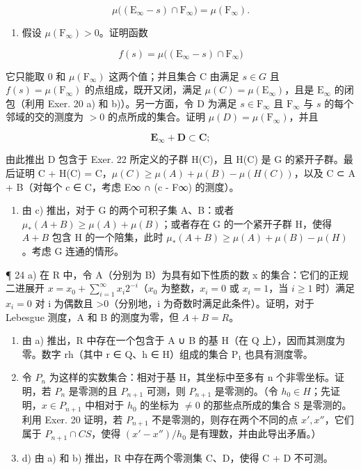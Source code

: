 \[
\mu \big ((\mathrm{E} _ {\infty} - s) \cap \mathrm{F} _ {\infty} \big) = \mu (\mathrm{F} _ {\infty}).
\]

\begin{enumerate}
\def\labelenumi{\alph{enumi})}
\setcounter{enumi}{2}
\tightlist
\item
  假设 \(\mu (\mathrm{F}_{\infty}) > 0\)。证明函数
\end{enumerate}

\[
f (s) = \mu \big ((\mathrm{E} _ {\infty} - s) \cap \mathrm{F} _ {\infty} \big)
\]

它只能取 0 和 \(\mu(\mathrm{F}_{\infty})\) 这两个值；并且集合 C 由满足 \(s \in G\) 且 \(f(s) = \mu(\mathrm{F}_{\infty})\) 的点组成，既开又闭，满足 \(\mu(C) = \mu(\mathrm{E}_{\infty})\)，且是 \(\mathrm{E}_{\infty}\) 的闭包（利用 Exer. 20 a) 和 b)）。另一方面，令 D 为满足 \(s \in \mathrm{F}_{\infty}\) 且 \(\mathrm{F}_{\infty}\) 与 \(s\) 的每个邻域的交的测度为 \(>0\) 的点所成的集合。证明 \(\mu(D) = \mu(\mathrm{F}_{\infty})\)，并且

\[
\mathbf {E} _ {\infty} + \mathbf {D} \subset \mathbf {C};
\]

由此推出 D 包含于 Exer. 22 所定义的子群 H(C)，且 H(C) 是 G 的紧开子群。最后证明 C + H(C) = C，\(\mu(C) \geqslant \mu(A) + \mu(B) - \mu(H(C))\)，以及 C ⊂ A + B（对每个 c ∈ C，考虑 E∞ ∩ (c - F∞) 的测度）。

\begin{enumerate}
\def\labelenumi{\alph{enumi})}
\setcounter{enumi}{3}
\tightlist
\item
  由 c) 推出，对于 G 的两个可积子集 A、B：或者 \(\mu_{*}(A+B)\geqslant\mu(A)+\mu(B)\)；或者存在 G 的一个紧开子群 H，使得 \(A+B\) 包含 H 的一个陪集，此时 \(\mu_{*}(A+B)\geqslant\mu(A)+\mu(B)-\mu(H)\)。考虑 G 连通的情形。
\end{enumerate}

¶ 24 a) 在 R 中，令 A（分别为 B）为具有如下性质的数 x 的集合：它们的正规二进展开 \(x = x_0 + \sum_{i=1}^{\infty} x_i 2^{-i}\)（\(x_0\) 为整数，\(x_i = 0\) 或 \(x_i = 1\)，当 \(i \geqslant 1\) 时）满足 \(x_{i}=0\) 对 i 为偶数且 \textgreater0（分别地，i 为奇数时满足此条件）。证明，对于 Lebesgue 测度，A 和 B 的测度为零，但 \(A+B=R\)。

\begin{enumerate}
\def\labelenumi{\alph{enumi})}
\setcounter{enumi}{1}
\item
  由 a) 推出，R 中存在一个包含于 A ∪ B 的基 H（在 Q 上），因而其测度为零。数字 rh（其中 r ∈ Q、h ∈ H）组成的集合 P₁ 也具有测度零。
\item
  令 \(P_{n}\) 为这样的实数集合：相对于基 H，其坐标中至多有 n 个非零坐标。证明，若 \(P_{n}\) 是零测的且 \(P_{n+1}\) 可测，则 \(P_{n+1}\) 是零测的。（令 \(h_{0} \in H\)；先证明，\(x \in P_{n+1}\) 中相对于 \(h_{0}\) 的坐标为 \(\neq 0\) 的那些点所成的集合 S 是零测的。利用 Exer. 20 证明，若 \(P_{n+1}\) 不是零测的，则存在两个不同的点 \(x', x''\)，它们属于 \(P_{n+1} \cap CS\)，使得 \((x' - x'') / h_{0}\) 是有理数，并由此导出矛盾。）
\item
  d) 由 a) 和 b) 推出，R 中存在两个零测集 C、D，使得 C + D 不可测。
\end{enumerate}

